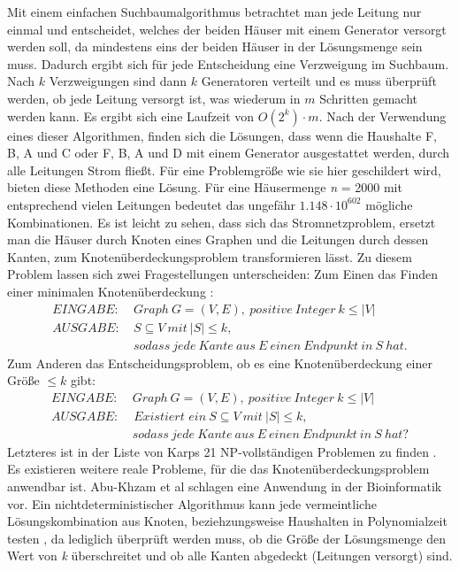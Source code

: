 Mit einem einfachen Suchbaumalgorithmus betrachtet man jede Leitung nur einmal und entscheidet, welches der beiden Häuser mit einem Generator versorgt werden soll, da mindestens eins der beiden Häuser in der Lösungsmenge sein muss. Dadurch ergibt sich für jede Entscheidung eine Verzweigung im Suchbaum. Nach $k$ Verzweigungen sind dann $k$ Generatoren verteilt und es muss überprüft werden, ob jede Leitung versorgt ist, was wiederum in $m$ Schritten gemacht werden kann. Es ergibt sich eine Laufzeit von $O(2^{k}) \cdot m$.
Nach der Verwendung eines dieser Algorithmen, finden sich die Lösungen, dass wenn die Haushalte F, B, A und C oder F, B, A und D mit einem Generator ausgestattet werden, durch alle Leitungen Strom fließt. Für eine Problemgröße wie sie hier geschildert wird, bieten diese Methoden eine Lösung. Für eine Häusermenge \emph{n} = 2000 mit entsprechend vielen Leitungen bedeutet das ungefähr $1.148 \cdot 10^{602}$ mögliche Kombinationen.
Es ist leicht zu sehen, dass sich das Stromnetzproblem, ersetzt man die Häuser durch Knoten eines Graphen und die Leitungen durch dessen Kanten, zum Knotenüberdeckungsproblem transformieren lässt. Zu diesem Problem lassen sich zwei Fragestellungen unterscheiden: Zum Einen das Finden einer minimalen Knotenüberdeckung \cite{trees}:
\begin{align*}
EINGABE: &\ Graph\ G=(V,E),\ positive\ Integer\ k\leq |V|\\
AUSGABE: &\ S\subseteq V\ mit\ |S|\leq k,\\
&\ sodass\ jede\ Kante\ aus\ E\ einen\ Endpunkt\ in\ S\ hat.
\end{align*}
Zum Anderen das Entscheidungsproblem, ob es eine Knotenüberdeckung einer Größe $\leq k$ gibt:
\begin{align*}
EINGABE: &\ Graph\ G=(V,E),\ positive\ Integer\ k\leq |V|\\
AUSGABE: &\textit{ Existiert ein}\ S\subseteq V\ mit\ |S|\leq k,\\
&\ sodass\ jede\ Kante\ aus\ E\ einen\ Endpunkt\ in\ S\ hat?
\end{align*}
Letzteres ist in der Liste von Karps 21 NP-vollständigen Problemen zu finden \cite{karp}.
Es existieren weitere reale Probleme, für die das Knotenüberdeckungsproblem anwendbar ist. Abu-Khzam et al \cite{paper:3} schlagen eine Anwendung in der Bioinformatik vor.
Ein nichtdeterministischer Algorithmus kann jede vermeintliche Lösungskombination aus Knoten, beziehzungsweise Haushalten in Polynomialzeit testen \cite{intract}, da lediglich überprüft werden muss, ob die Größe der Lösungsmenge den Wert von \emph{k} überschreitet und ob alle Kanten abgedeckt (Leitungen versorgt) sind.

